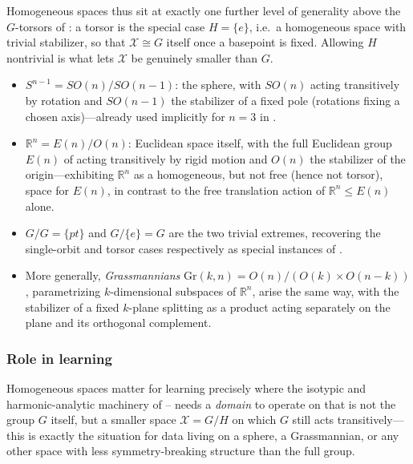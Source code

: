 \documentclass[mathematics,review,submit,moreauthors]{Definitions/mdpi}
\begin{document}
Homogeneous spaces thus sit at exactly one further level of generality above
the $G$-torsors of : a torsor is the
special case $H = \{e\}$, i.e.\ a homogeneous space with trivial stabilizer,
so that $\mathcal{X} \cong G$ itself once a basepoint is fixed. Allowing $H$ nontrivial
is what lets $\mathcal{X}$ be genuinely smaller than $G$.

\begin{Example}
\label{ex:homogeneous-spaces}
\begin{itemize}
    \item $S^{n-1} = SO(n)/SO(n-1)$: the sphere, with $SO(n)$ acting
    transitively by rotation and $SO(n-1)$ the stabilizer of a fixed pole
    (rotations fixing a chosen axis)---already used implicitly for $n=3$ in
    .
    \item $\mathbb{R}^n = E(n) / O(n)$: Euclidean space itself, with the
    full Euclidean group $E(n)$ of 
    acting transitively by rigid motion and $O(n)$ the stabilizer of the
    origin---exhibiting $\mathbb{R}^n$ as a homogeneous, but not free
    (hence not torsor), space for $E(n)$, in contrast to the free
    translation action of $\mathbb{R}^n \leq E(n)$ alone.
    \item $G/G = \{pt\}$ and $G/\{e\} = G$ are the two trivial extremes,
    recovering the single-orbit and torsor cases respectively as special
    instances of .
    \item More generally, \emph{Grassmannians} $\mathrm{Gr}(k,n) =
    O(n)/(O(k)\times O(n-k))$, parametrizing $k$-dimensional subspaces of
    $\mathbb{R}^n$, arise the same way, with the stabilizer of a fixed
    $k$-plane splitting as a product acting separately on the plane and its
    orthogonal complement.
\end{itemize}
\end{Example}

\subsubsection{Role in learning}
\label{subsubsec:homogeneous-spaces-learning}

Homogeneous spaces matter for learning precisely where the isotypic and
harmonic-analytic machinery of
--
needs a \emph{domain} to operate on that is not the group $G$ itself, but a
smaller space $\mathcal{X} = G/H$ on which $G$ still acts transitively---this is
exactly the situation for data living on a sphere, a Grassmannian, or any
other space with less symmetry-breaking structure than the full group.
\end{document}
